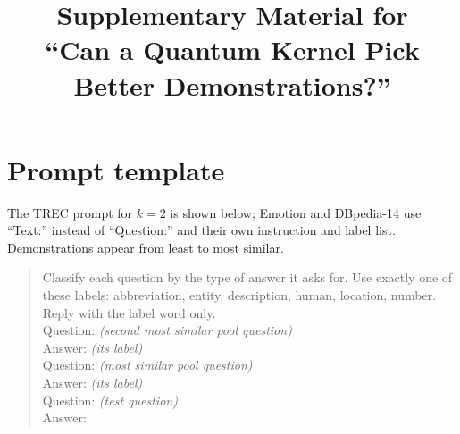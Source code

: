 
\usepackage{amsmath,amssymb}
\usepackage{graphicx}
\usepackage{booktabs}
\usepackage{xcolor}
\usepackage{url}
\newcommand{\res}[1]{#1}


\providecommand{\fillin}[1]{{\color{red}[#1]}}
\renewcommand{\thetable}{S\arabic{table}}
\renewcommand{\thefigure}{S\arabic{figure}}


\title{Supplementary Material for\\ ``Can a Quantum Kernel Pick Better Demonstrations?''}

\makefrontplain

\section{Prompt template}
The TREC prompt for $k=2$ is shown below; Emotion and DBpedia-14 use ``Text:'' instead of
``Question:'' and their own instruction and label list. Demonstrations appear from least to most
similar.
\begin{quote}\footnotesize\ttfamily
Classify each question by the type of answer it asks for. Use exactly one of these labels:
abbreviation, entity, description, human, location, number. Reply with the label word only.\\[2pt]
Question: \textit{(second most similar pool question)}\\
Answer: \textit{(its label)}\\[2pt]
Question: \textit{(most similar pool question)}\\
Answer: \textit{(its label)}\\[2pt]
Question: \textit{(test question)}\\
Answer:
\end{quote}

